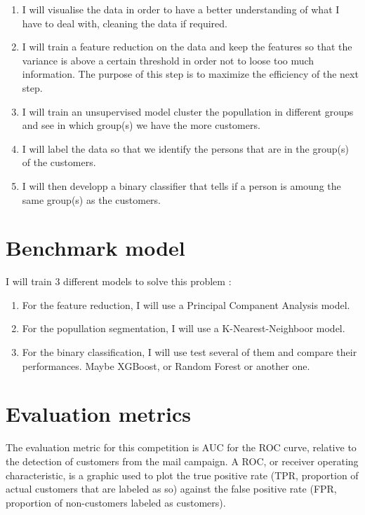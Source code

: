 \documentclass[12pt]{article}
\begin{document}
\begin{enumerate}
\item I will visualise the data in order to have a better understanding of what I have to deal with, cleaning the data if required.
\item I will train a feature reduction on the data and keep the features so that the variance is above a certain threshold in order not to loose too much information. The purpose of this step is to maximize the efficiency of the next step.
\item I will train an unsupervised model cluster the popullation in different groups and see in which group(s) we have the more customers.
\item I will label the data so that we identify the persons that are in the group(s) of the customers.
\item I will then developp a binary classifier that tells if a person is amoung the same group(s) as the customers.
\end{enumerate}


\section{Benchmark model}

I will train 3 different models to solve this problem :
\begin{enumerate}
\item For the feature reduction, I will use a Principal Companent Analysis model.
\item  For the popullation segmentation, I will use a K-Nearest-Neighboor model.
\item For the binary classification, I will use test several of them and compare their performances. Maybe XGBoost, or Random Forest or another one.
\end{enumerate}

\section{Evaluation metrics}

The evaluation metric for this competition is AUC for the ROC curve, relative to the detection of customers from the mail campaign. A ROC, or receiver operating characteristic, is a graphic used to plot the true positive rate (TPR, proportion of actual customers that are labeled as so) against the false positive rate (FPR, proportion of non-customers labeled as customers).
\end{document}
